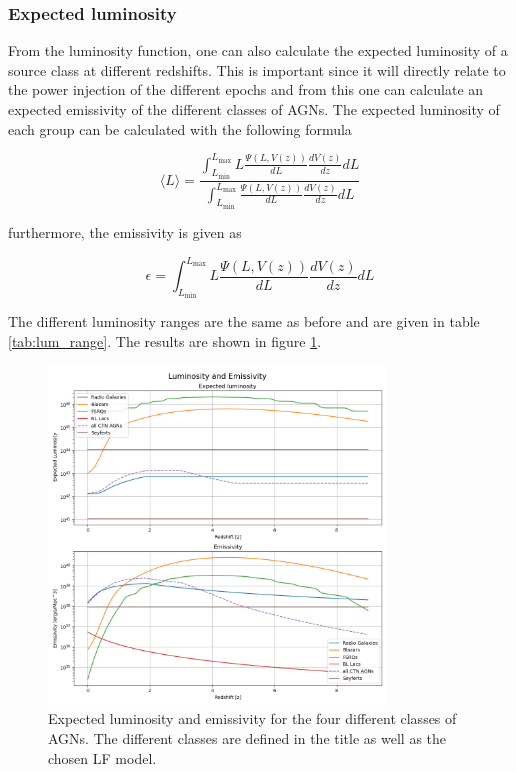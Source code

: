 \subsubsection{Expected luminosity}
From the luminosity function, one can also calculate the expected luminosity of a source class at different redshifts. This is important since it will directly relate to the 
power injection of the different epochs and from this one can calculate an expected emissivity of the different classes of AGNs. 
The expected luminosity of each group can be calculated with the following formula

\begin{equation}
    \langle L \rangle = \frac{\int_{L_{\text{min}}}^{L_{\text{max}}} L \frac{\Psi(L, V(z))}{dL} \frac{dV(z)}{dz} dL}{\int_{L_{\text{min}}}^{L_{\text{max}}} \frac{\Psi(L, V(z))}{dL} \frac{dV(z)}{dz} dL}
\end{equation}

furthermore, the emissivity is given as


\begin{equation}
     \epsilon  = \int_{L_{\text{min}}}^{L_{\text{max}}} L \frac{\Psi(L, V(z))}{dL} \frac{dV(z)}{dz} dL
\end{equation}

The different luminosity ranges are the same as before and are given in table \ref{tab:lum_range}. The results are shown in figure \ref{fig:EL}.

\begin{figure}
    \centering
    \includegraphics[width = 0.8\textwidth]{new_plots/Luminosity and Emissivity.png}
    \caption{Expected luminosity and emissivity for the four different classes of AGNs. The different classes are defined in the title as well as the chosen LF model.}
    \label{fig:EL}
\end{figure}



